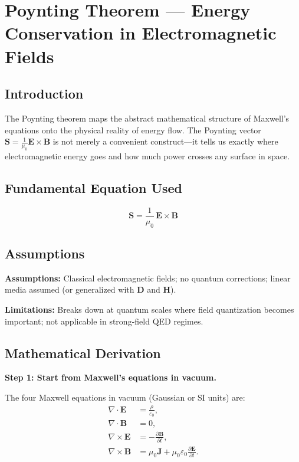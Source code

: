 \chapter{Poynting Theorem — Energy Conservation in Electromagnetic Fields}

\section*{Introduction}

The Poynting theorem maps the abstract mathematical structure of Maxwell's equations onto the physical reality of energy flow. The Poynting vector $\mathbf{S} = \frac{1}{\mu_0}\mathbf{E} \times \mathbf{B}$ is not merely a convenient construct---it tells us exactly where electromagnetic energy goes and how much power crosses any surface in space.
\section*{Fundamental Equation Used}

\begin{equation}
\mathbf{S} = \frac{1}{\mu_0}\,\mathbf{E} \times \mathbf{B}
\end{equation}
\section*{Assumptions}

\textbf{Assumptions:} Classical electromagnetic fields; no quantum corrections; linear media assumed (or generalized with $\mathbf{D}$ and $\mathbf{H}$).


\textbf{Limitations:} Breaks down at quantum scales where field quantization becomes important; not applicable in strong-field QED regimes.


\section*{Mathematical Derivation}

\textbf{Step 1: Start from Maxwell's equations in vacuum.}

The four Maxwell equations in vacuum (Gaussian or SI units) are:
\begin{align}
\nabla\cdot\mathbf{E} &= \frac{\rho}{\varepsilon_0}, \\
\nabla\cdot\mathbf{B} &= 0, \\
\nabla\times\mathbf{E} &= -\frac{\partial\mathbf{B}}{\partial t}, \\
\nabla\times\mathbf{B} &= \mu_0\mathbf{J} + \mu_0\varepsilon_0\frac{\partial\mathbf{E}}{\partial t}.
\end{align}

